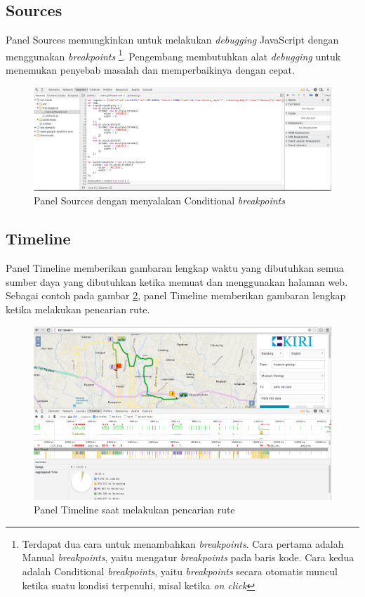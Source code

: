\subsection{Sources}
Panel Sources memungkinkan untuk melakukan \textit{debugging} JavaScript dengan menggunakan \textit{breakpoints} \footnote{Terdapat dua cara untuk menambahkan \textit{breakpoints}. Cara pertama adalah Manual \textit{breakpoints}, yaitu mengatur \textit{breakpoints} pada baris kode. Cara kedua adalah Conditional \textit{breakpoints}, yaitu \textit{breakpoints} secara otomatis muncul ketika suatu kondisi terpenuhi, misal ketika \textit{on click}}. Pengembang membutuhkan alat \textit{debugging} untuk menemukan penyebab masalah dan memperbaikinya dengan cepat.

\begin{figure}[H]
	\centering
	\includegraphics[scale=0.3]{Gambar/devtools-sources}
	\caption{Panel Sources dengan menyalakan Conditional \textit{breakpoints}} 
	\label{fig:2_devtools_sources}
\end{figure}

\subsection{Timeline}
Panel Timeline memberikan gambaran lengkap waktu yang dibutuhkan semua sumber daya yang dibutuhkan ketika memuat dan menggunakan halaman web. Sebagai contoh pada gambar \ref{fig:2_devtools_timeline}, panel Timeline memberikan gambaran lengkap ketika melakukan pencarian rute. 

\begin{figure}[H]
	\centering
	\includegraphics[scale=0.3]{Gambar/devtools-timeline}
	\caption{Panel Timeline saat melakukan pencarian rute} 
	\label{fig:2_devtools_timeline}
\end{figure}

